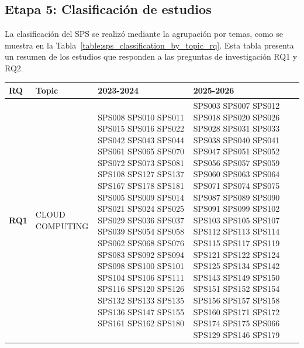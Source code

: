 
\subsection{Etapa 5: Clasificación de estudios}\label{subsec:clasificacion-de-estudios}
La clasificación del SPS se realizó mediante la agrupación por temas, como se muestra en la Tabla~\ref{table:sps_classification_by_topic_rq}. 
Esta tabla presenta un resumen de los estudios que responden a las preguntas de investigación RQ1 y RQ2.

\begin{table}[htbp]
	\centering
	\tiny
	\renewcommand{\arraystretch}{0.5}
	\begin{tabularx}{\textwidth}{p{0.5cm}p{1.5cm}>{\raggedright\arraybackslash}X>{\raggedright\arraybackslash}X>{\raggedright\arraybackslash}X}
		\toprule
		\textbf{RQ}                           & \textbf{Topic}   	& \textbf{2023-2024}                         & \textbf{2025-2026}  						\\
		\midrule
		\multirow{0}{*}[-10em]{\textbf{RQ1}} & CLOUD 
												COMPUTING 		& SPS008 SPS010 SPS011 SPS015 SPS016 SPS022
																	  SPS042 SPS043 SPS044 SPS061 SPS065 SPS070 
																	  SPS072 SPS073 SPS081 SPS108 SPS127 SPS137 
																	  SPS167 SPS178 SPS181 SPS005 SPS009 SPS014 
																	  SPS021 SPS024 SPS025 SPS029 SPS036 SPS037 
																	  SPS039 SPS054 SPS058 SPS062 SPS068 SPS076 
																	  SPS083 SPS092 SPS094 SPS098 SPS100 SPS101 
																	  SPS104 SPS106 SPS111 SPS116 SPS120 SPS126 
																	  SPS132 SPS133 SPS135 SPS136 SPS147 SPS155 
																	  SPS161 SPS162 SPS180	     				 & SPS003 SPS007 SPS012 SPS018 SPS020 SPS026
																												   SPS028 SPS031 SPS033 SPS038 SPS040 SPS041 
																												   SPS047 SPS051 SPS052 SPS056 SPS057 SPS059 
																												   SPS060 SPS063 SPS064 SPS071 SPS074 SPS075 
																												   SPS087 SPS089 SPS090 SPS091 SPS099 SPS102 
																												   SPS103 SPS105 SPS107 SPS112 SPS113 SPS114 
																												   SPS115 SPS117 SPS119 SPS121 SPS122 SPS124 
																												   SPS125 SPS134 SPS142 SPS143 SPS149 SPS150 
																												   SPS151 SPS152 SPS154 SPS156 SPS157 SPS158 
																												   SPS160 SPS171 SPS172 SPS174 SPS175 SPS066 
																												   SPS129 SPS146 SPS179                        \\

\end{tabularx}
\end{table}
